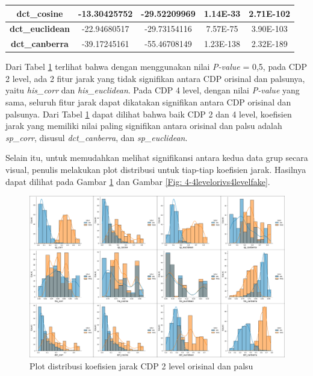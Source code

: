 \begin{table}[!ht]
\begin{tabular}{|c|cc|cc|}
		\textbf{dct\_cosine}    & \multicolumn{1}{c|}{-13.30425752}         & -29.52209969                          & \multicolumn{1}{c|}{1.14E-33}         & 2.71E-102        \\ \hline
		\textbf{dct\_euclidean} & \multicolumn{1}{c|}{-22.94680517}         & -29.73154116                          & \multicolumn{1}{c|}{7.57E-75}         & 3.90E-103        \\ \hline
		\textbf{dct\_canberra}  & \multicolumn{1}{c|}{-39.17245161}         & -55.46708149                          & \multicolumn{1}{c|}{1.23E-138}        & 2.32E-189        \\ \hline
	\end{tabular}
	\label{Tab: 4-hasilujisignifikansiorivspalsu}
\end{table}

Dari Tabel \ref{Tab: 4-hasilujisignifikansiorivspalsu} terlihat bahwa dengan menggunakan nilai \emph{P-value} = 0,5, pada CDP 2 level, ada 2 fitur jarak yang
tidak signifikan antara CDP orisinal dan palsunya, yaitu \emph{his\_corr} dan \emph{his\_euclidean}. Pada CDP 4 level, dengan nilai \emph{P-value} yang sama,
seluruh fitur jarak dapat dikatakan signifikan antara CDP orisinal dan palsunya. Dari Tabel \ref{Tab: 4-hasilujisignifikansiorivspalsu} dapat dilihat bahwa
baik CDP 2 dan 4 level, koefisien jarak yang memiliki nilai paling signifikan antara orisinal dan palsu adalah \emph{sp\_corr}, disusul \emph{dct\_canberra},
dan \emph{sp\_euclidean}.

Selain itu, untuk memudahkan melihat signifikansi antara kedua data grup secara visual, penulis melakukan plot distribusi untuk tiap-tiap koefisien jarak.
Hasilnya dapat dilihat pada Gambar \ref{Fig: 4-2levelorivs2levelfake} dan Gambar \ref{Fig: 4-4levelorivs4levelfake}.

\begin{figure}[!h]
	\centering
	\includegraphics[width=\textwidth]{contents/chapter-4/4-2levelorivs2levelfake.png}
	\caption{Plot distribusi koefisien jarak CDP 2 level orisinal dan palsu}
	\label{Fig: 4-2levelorivs2levelfake}
\end{figure}

